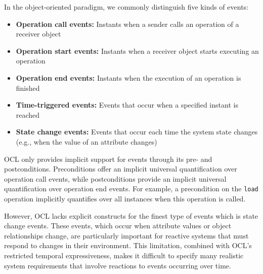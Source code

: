 In the object-oriented paradigm, we commonly distinguish five kinds of events: 
\begin{itemize} 
    \item \textbf{Operation call events:} Instants when a sender calls an operation of a receiver object 
    \item \textbf{Operation start events:} Instants when a receiver object starts executing an operation 
    \item \textbf{Operation end events:} Instants when the execution of an operation is finished 
    \item \textbf{Time-triggered events:} Events that occur when a specified instant is reached 
    \item \textbf{State change events:} Events that occur each time the system state changes (e.g., when the value of an attribute changes) 
\end{itemize}

OCL only provides implicit support for events through its pre- and postconditions. 
Preconditions offer an implicit universal quantification over operation call events, 
while postconditions provide an implicit universal quantification over operation end 
events. For example, a precondition on the \texttt{load} operation implicitly 
quantifies over all instances when this operation is called.

However, OCL lacks explicit constructs for the finest type of events which is state change 
events. These events, which occur when attribute values or object relationships 
change, are particularly important for reactive systems that must respond to changes 
in their environment. This limitation, combined with OCL's restricted temporal 
expressiveness, makes it difficult to specify many realistic system requirements 
that involve reactions to events occurring over time.

